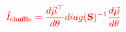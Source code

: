 \documentclass[10pt]{article}
\begin{document}
\begin{align*}\color{red}{\hat{I}_\textrm{shuffle} = \frac{d \vec{\mu}^{\top}}{d \theta} diag(\mathbf{S})^{-1} \frac{d \vec{\mu}}{d \theta}}\end{align*}
\end{document}
